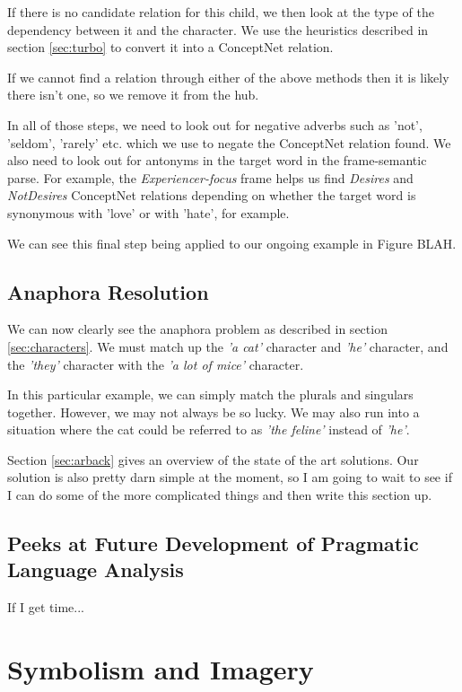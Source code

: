 If there is no candidate relation for this child, we then look at the type of the dependency between it and the character. We use the heuristics described in section \ref{sec:turbo} to convert it into a ConceptNet relation.

If we cannot find a relation through either of the above methods then it is likely there isn't one, so we remove it from the hub.

In all of those steps, we need to look out for negative adverbs such as 'not', 'seldom', 'rarely' etc. which we use to negate the ConceptNet relation found. We also need to look out for antonyms in the target word in the frame-semantic parse. For example, the \textit{Experiencer-focus} frame helps us find \textit{Desires} and \textit{NotDesires} ConceptNet relations depending on whether the target word is synonymous with 'love' or with 'hate', for example.

We can see this final step being applied to our ongoing example in Figure BLAH.


\subsection{Anaphora Resolution}
\label{sec:ar}
We can now clearly see the anaphora problem as described in section \ref{sec:characters}. We must match up the \textit{'a cat'} character and \textit{'he'} character, and the \textit{'they'} character with the \textit{'a lot of mice'} character. 

In this particular example, we can simply match the plurals and singulars together. However, we may not always be so lucky. We may also run into a situation where the cat could be referred to as \textit{'the feline'} instead of \textit{'he'}.

Section \ref{sec:arback} gives an overview of the state of the art solutions. Our solution is also pretty darn simple at the moment, so I am going to wait to see if I can do some of the more complicated things and then write this section up.


\subsection{Peeks at Future Development of Pragmatic Language Analysis}

If I get time...


\section{Symbolism and Imagery}


